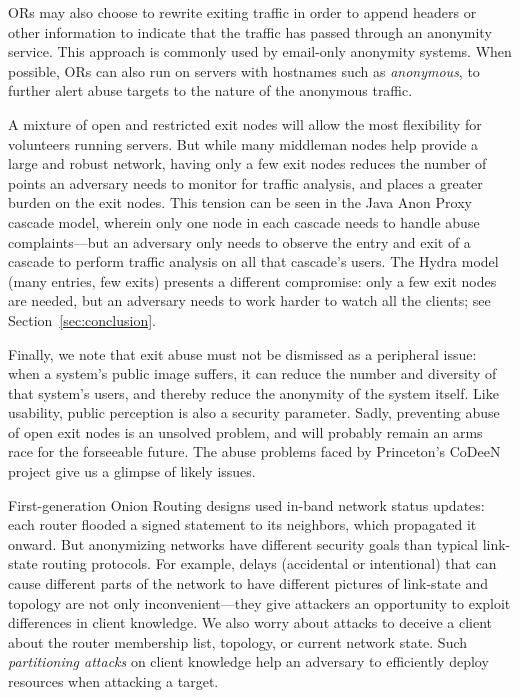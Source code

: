 \documentclass[times,10pt,twocolumn]{article}
\begin{document}
ORs may also choose to rewrite exiting traffic in order to append
headers or other information to indicate that the traffic has passed
through an anonymity service.  This approach is commonly used
by email-only anonymity systems.  When possible, ORs can also
run on servers with hostnames such as {\it anonymous}, to further
alert abuse targets to the nature of the anonymous traffic.

A mixture of open and restricted exit nodes will allow the most
flexibility for volunteers running servers. But while many
middleman nodes help provide a large and robust network,
having only a few exit nodes reduces the number of points
an adversary needs to monitor for traffic analysis, and places a
greater burden on the exit nodes.  This tension can be seen in the
Java Anon Proxy
cascade model, wherein only one node in each cascade needs to handle
abuse complaints---but an adversary only needs to observe the entry
and exit of a cascade to perform traffic analysis on all that
cascade's users. The Hydra model (many entries, few exits) presents a
different compromise: only a few exit nodes are needed, but an
adversary needs to work harder to watch all the clients; see
Section~\ref{sec:conclusion}.

Finally, we note that exit abuse must not be dismissed as a peripheral
issue: when a system's public image suffers, it can reduce the number
and diversity of that system's users, and thereby reduce the anonymity
of the system itself.  Like usability, public perception is also a
security parameter.  Sadly, preventing abuse of open exit nodes is an
unsolved problem, and will probably remain an arms race for the
forseeable future.  The abuse problems faced by Princeton's CoDeeN
project \cite{darkside} give us a glimpse of likely issues.

\label{subsec:dirservers}

First-generation Onion Routing designs \cite{freedom2-arch,or-jsac98} used
in-band network status updates: each router flooded a signed statement
to its neighbors, which propagated it onward. But anonymizing networks
have different security goals than typical link-state routing protocols.
For example, delays (accidental or intentional)
that can cause different parts of the network to have different pictures
of link-state and topology are not only inconvenient---they give
attackers an opportunity to exploit differences in client knowledge.
We also worry about attacks to deceive a
client about the router membership list, topology, or current network
state. Such \emph{partitioning attacks} on client knowledge help an
adversary to efficiently deploy resources
when attacking a target.
\end{document}
